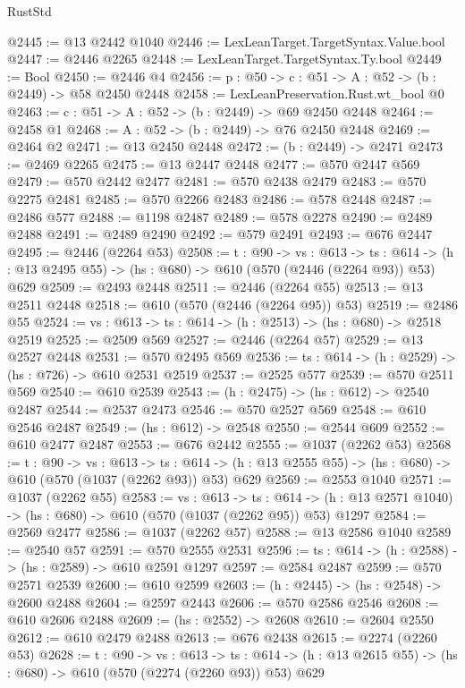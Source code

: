 \begin{lexlean}{RustStd}
\begin{coremodule}
@2445 := @13 @2442 @1040
@2446 := LexLeanTarget.TargetSyntax.Value.bool
@2447 := @2446 @2265
@2448 := LexLeanTarget.TargetSyntax.Ty.bool
@2449 := Bool
@2450 := @2446 @4
@2456 := {p : @50} -> {c : @51} -> {A : @52} -> (b : @2449) -> @58 @2450 @2448
@2458 := LexLeanPreservation.Rust.wt_bool @0
@2463 := {c : @51} -> {A : @52} -> (b : @2449) -> @69 @2450 @2448
@2464 := @2458 @1
@2468 := {A : @52} -> (b : @2449) -> @76 @2450 @2448
@2469 := @2464 @2
@2471 := @13 @2450 @2448
@2472 := (b : @2449) -> @2471
@2473 := @2469 @2265
@2475 := @13 @2447 @2448
@2477 := @570 @2447 @569
@2479 := @570 @2442 @2477
@2481 := @570 @2438 @2479
@2483 := @570 @2275 @2481
@2485 := @570 @2266 @2483
@2486 := @578 @2448
@2487 := @2486 @577
@2488 := @1198 @2487
@2489 := @578 @2278
@2490 := @2489 @2488
@2491 := @2489 @2490
@2492 := @579 @2491
@2493 := @676 @2447
@2495 := @2446 (@2264 @53)
@2508 := {t : @90} ->
  {vs : @613} ->
  {ts : @614} -> (h : @13 @2495 @55) -> (hs : @680) -> @610 (@570 (@2446 (@2264 @93)) @53) @629
@2509 := @2493 @2448
@2511 := @2446 (@2264 @55)
@2513 := @13 @2511 @2448
@2518 := @610 (@570 (@2446 (@2264 @95)) @53)
@2519 := @2486 @55
@2524 := {vs : @613} -> {ts : @614} -> (h : @2513) -> (hs : @680) -> @2518 @2519
@2525 := @2509 @569
@2527 := @2446 (@2264 @57)
@2529 := @13 @2527 @2448
@2531 := @570 @2495 @569
@2536 := {ts : @614} -> (h : @2529) -> (hs : @726) -> @610 @2531 @2519
@2537 := @2525 @577
@2539 := @570 @2511 @569
@2540 := @610 @2539
@2543 := (h : @2475) -> (hs : @612) -> @2540 @2487
@2544 := @2537 @2473
@2546 := @570 @2527 @569
@2548 := @610 @2546 @2487
@2549 := (hs : @612) -> @2548
@2550 := @2544 @609
@2552 := @610 @2477 @2487
@2553 := @676 @2442
@2555 := @1037 (@2262 @53)
@2568 := {t : @90} ->
  {vs : @613} ->
  {ts : @614} -> (h : @13 @2555 @55) -> (hs : @680) -> @610 (@570 (@1037 (@2262 @93)) @53) @629
@2569 := @2553 @1040
@2571 := @1037 (@2262 @55)
@2583 := {vs : @613} ->
  {ts : @614} -> (h : @13 @2571 @1040) -> (hs : @680) -> @610 (@570 (@1037 (@2262 @95)) @53) @1297
@2584 := @2569 @2477
@2586 := @1037 (@2262 @57)
@2588 := @13 @2586 @1040
@2589 := @2540 @57
@2591 := @570 @2555 @2531
@2596 := {ts : @614} -> (h : @2588) -> (hs : @2589) -> @610 @2591 @1297
@2597 := @2584 @2487
@2599 := @570 @2571 @2539
@2600 := @610 @2599
@2603 := (h : @2445) -> (hs : @2548) -> @2600 @2488
@2604 := @2597 @2443
@2606 := @570 @2586 @2546
@2608 := @610 @2606 @2488
@2609 := (hs : @2552) -> @2608
@2610 := @2604 @2550
@2612 := @610 @2479 @2488
@2613 := @676 @2438
@2615 := @2274 (@2260 @53)
@2628 := {t : @90} ->
  {vs : @613} ->
  {ts : @614} -> (h : @13 @2615 @55) -> (hs : @680) -> @610 (@570 (@2274 (@2260 @93)) @53) @629

\end{coremodule}
\end{lexlean}
